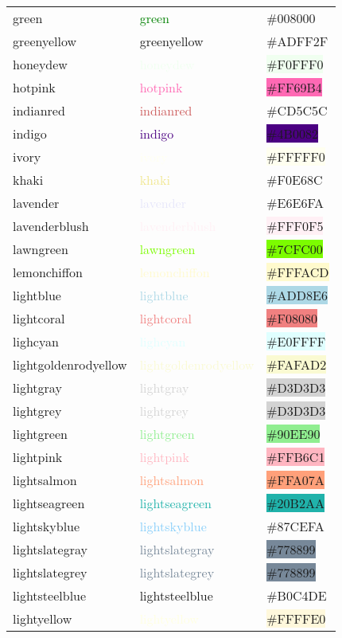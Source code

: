\documentclass[
]{article}
\begin{document}
\begin{longtable}[]{@{}lll@{}}
green & \textcolor{green}{green} &
\colorbox{officegreen}{\#008000}\tabularnewline
greenyellow & \textcolor{green-yellow}{greenyellow} &
\colorbox{green-yellow}{\#ADFF2F}\tabularnewline
honeydew & \textcolor{honeydew}{honeydew} &
\colorbox{honeydew}{\#F0FFF0}\tabularnewline
hotpink & \textcolor{hotpink}{hotpink} &
\colorbox{hotpink}{\#FF69B4}\tabularnewline
indianred & \textcolor{indianred}{indianred} &
\colorbox{chestnut}{\#CD5C5C}\tabularnewline
indigo & \textcolor{indigo}{indigo} &
\colorbox{indigo}{\#4B0082}\tabularnewline
ivory & \textcolor{ivory}{ivory} &
\colorbox{ivory}{\#FFFFF0}\tabularnewline
khaki & \textcolor{khaki}{khaki} &
\colorbox{lightkhaki}{\#F0E68C}\tabularnewline
lavender & \textcolor{lavender}{lavender} &
\colorbox{lightlavender}{\#E6E6FA}\tabularnewline
lavenderblush & \textcolor{lavenderblush}{lavenderblush} &
\colorbox{lavenderblush}{\#FFF0F5}\tabularnewline
lawngreen & \textcolor{lawngreen}{lawngreen} &
\colorbox{lawngreen}{\#7CFC00}\tabularnewline
lemonchiffon & \textcolor{lemonchiffon}{lemonchiffon} &
\colorbox{lemonchiffon}{\#FFFACD}\tabularnewline
lightblue & \textcolor{lightblue}{lightblue} &
\colorbox{lightblue}{\#ADD8E6}\tabularnewline
lightcoral & \textcolor{lightcoral}{lightcoral} &
\colorbox{lightcoral}{\#F08080}\tabularnewline
lighcyan & \textcolor{lightcyan}{lighcyan} &
\colorbox{lightcyan}{\#E0FFFF}\tabularnewline
lightgoldenrodyellow &
\textcolor{lightgoldenrodyellow}{lightgoldenrodyellow} &
\colorbox{lightgoldenrodyellow}{\#FAFAD2}\tabularnewline
lightgray & \textcolor{lightgray}{lightgray} &
\colorbox{lightgray}{\#D3D3D3}\tabularnewline
lightgrey & \textcolor{lightgray}{lightgrey} &
\colorbox{lightgray}{\#D3D3D3}\tabularnewline
lightgreen & \textcolor{lightgreen}{lightgreen} &
\colorbox{lightgreen}{\#90EE90}\tabularnewline
lightpink & \textcolor{lightpink}{lightpink} &
\colorbox{lightpink}{\#FFB6C1}\tabularnewline
lightsalmon & \textcolor{lightsalmon}{lightsalmon} &
\colorbox{lightsalmon}{\#FFA07A}\tabularnewline
lightseagreen & \textcolor{lightseagreen}{lightseagreen} &
\colorbox{lightseagreen}{\#20B2AA}\tabularnewline
lightskyblue & \textcolor{lightskyblue}{lightskyblue} &
\colorbox{babyblue}{\#87CEFA}\tabularnewline
lightslategray & \textcolor{lightslategray}{lightslategray} &
\colorbox{lightslategray}{\#778899}\tabularnewline
lightslategrey & \textcolor{lightslategray}{lightslategrey} &
\colorbox{lightslategray}{\#778899}\tabularnewline
lightsteelblue & \textcolor{pastelblue}{lightsteelblue} &
\colorbox{pastelblue}{\#B0C4DE}\tabularnewline
lightyellow & \textcolor{lightyellow}{lightyellow} &
\colorbox{cornsilk}{\#FFFFE0}\tabularnewline

\end{longtable}
\end{document}
